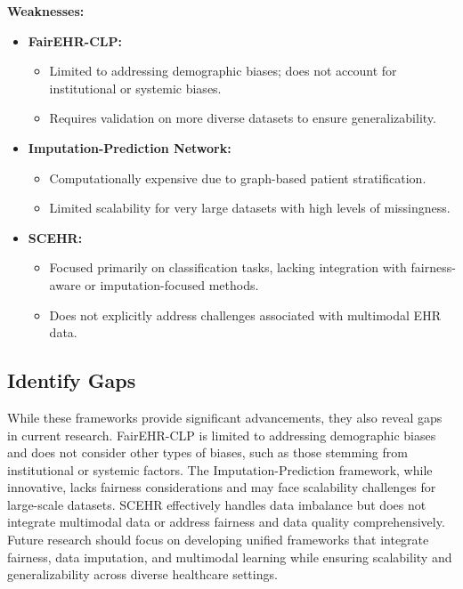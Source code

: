 \documentclass[a4paper]{article}
\begin{document}
    \textbf{Weaknesses:}
    \begin{itemize}
        \item \textbf{FairEHR-CLP:}
            \begin{itemize}
                \item Limited to addressing demographic biases; does not account
                    for institutional or systemic biases.

                \item Requires validation on more diverse datasets to ensure generalizability.
            \end{itemize}

        \item \textbf{Imputation-Prediction Network:}
            \begin{itemize}
                \item Computationally expensive due to graph-based patient stratification.

                \item Limited scalability for very large datasets with high levels
                    of missingness.
            \end{itemize}

        \item \textbf{SCEHR:}
            \begin{itemize}
                \item Focused primarily on classification tasks, lacking
                    integration with fairness-aware or imputation-focused
                    methods.

                \item Does not explicitly address challenges associated with multimodal
                    EHR data.
            \end{itemize}
    \end{itemize}

    \subsection{Identify Gaps}
    While these frameworks provide significant advancements, they also reveal gaps
    in current research. FairEHR-CLP is limited to addressing demographic biases
    and does not consider other types of biases, such as those stemming from institutional
    or systemic factors. The Imputation-Prediction framework, while innovative,
    lacks fairness considerations and may face scalability challenges for large-scale
    datasets. SCEHR effectively handles data imbalance but does not integrate multimodal
    data or address fairness and data quality comprehensively. Future research
    should focus on developing unified frameworks that integrate fairness, data imputation,
    and multimodal learning while ensuring scalability and generalizability
    across diverse healthcare settings.
\end{document}

